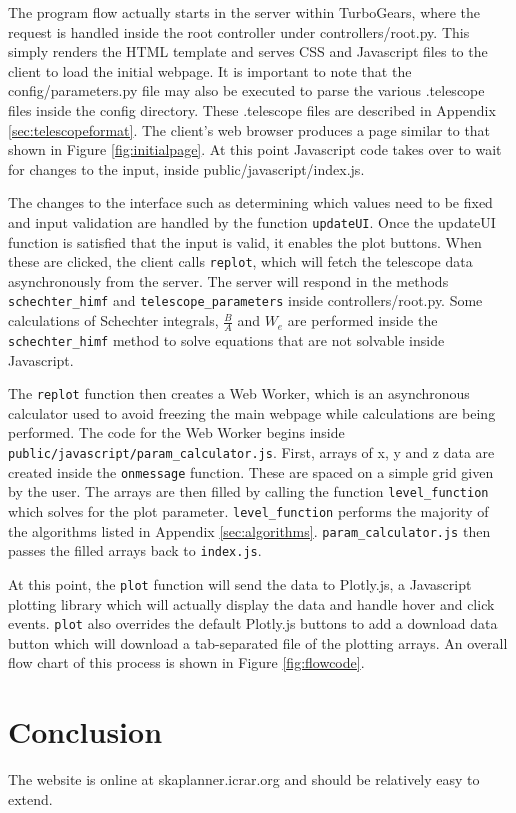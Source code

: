 \documentclass[11pt]{article}
\begin{document}
The program flow actually starts in the server within TurboGears, where the request is handled inside the root controller under controllers/root.py. This simply renders the HTML template and serves CSS and Javascript files to the client to load the initial webpage. It is important to note that the config/parameters.py file may also be executed to parse the various .telescope files inside the config directory. These .telescope files are described in Appendix \ref{sec:telescopeformat}. The client's web browser produces a page similar to that shown in Figure \ref{fig:initialpage}. At this point Javascript code takes over to wait for changes to the input, inside public/javascript/index.js.

The changes to the interface such as determining which values need to be fixed and input validation are handled by the function \texttt{updateUI}. Once the updateUI function is satisfied that the input is valid, it enables the plot buttons. When these are clicked, the client calls \texttt{replot}, which will fetch the telescope data asynchronously from the server. The server will respond in the methods \verb|schechter_himf| and \verb|telescope_parameters| inside controllers/root.py. Some calculations of Schechter integrals, $\frac{B}{A}$ and $W_e$ are performed inside the \verb|schechter_himf| method to solve equations that are not solvable inside Javascript.

The \texttt{replot} function then creates a Web Worker, which is an asynchronous calculator used to avoid freezing the main webpage while calculations are being performed. The code for the Web Worker begins inside \verb|public/javascript/param_calculator.js|. First, arrays of x, y and z data are created inside the \texttt{onmessage} function. These are spaced on a simple grid given by the user. The arrays are then filled by calling the function \verb|level_function| which solves for the plot parameter. \verb|level_function| performs the majority of the algorithms listed in Appendix \ref{sec:algorithms}. \verb|param_calculator.js| then passes the filled arrays back to \verb|index.js|. 

At this point, the \texttt{plot} function will send the data to Plotly.js, a Javascript plotting library which will actually display the data and handle hover and click events. \texttt{plot} also overrides the default Plotly.js buttons to add a download data button which will download a tab-separated file of the plotting arrays. An overall flow chart of this process is shown in Figure \ref{fig:flowcode}.
\section{Conclusion}
The website is online at skaplanner.icrar.org and should be relatively easy to extend.
\appendix
\end{document}
